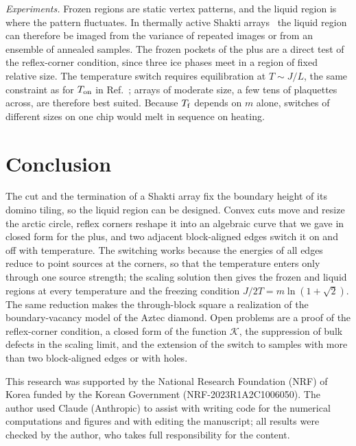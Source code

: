 \documentclass[reprint,aps,prb,floatfix,longbibliography,amsmath,amssymb]{revtex4-2}
\newcommand{\cK}{\mathcal{K}}
\newcommand{\lnt}{\ln(1+\sqrt2)}
\begin{document}
\emph{Experiments.} Frozen regions are static vertex patterns, and the liquid region is where the pattern fluctuates. In thermally active Shakti arrays~\cite{Gilbert2014,Lao2018} the liquid region can therefore be imaged from the variance of repeated images or from an ensemble of annealed samples. The frozen pockets of the plus are a direct test of the reflex-corner condition, since three ice phases meet in a region of fixed relative size. The temperature switch requires equilibration at $T\sim J/L$, the same constraint as for $T_{\rm on}$ in Ref.~\cite{KimVorticity}; arrays of moderate size, a few tens of plaquettes across, are therefore best suited. Because $T_{\rm f}$ depends on $m$ alone, switches of different sizes on one chip would melt in sequence on heating.

\section{Conclusion}\label{sec:conclusion}

The cut and the termination of a Shakti array fix the boundary height of its domino tiling, so the liquid region can be designed. Convex cuts move and resize the arctic circle, reflex corners reshape it into an algebraic curve that we gave in closed form for the plus, and two adjacent block-aligned edges switch it on and off with temperature. The switching works because the energies of all edges reduce to point sources at the corners, so that the temperature enters only through one source strength; the scaling solution then gives the frozen and liquid regions at every temperature and the freezing condition $J/2T=m\lnt$. The same reduction makes the through-block square a realization of the boundary-vacancy model of the Aztec diamond. Open problems are a proof of the reflex-corner condition, a closed form of the function $\cK$, the suppression of bulk defects in the scaling limit, and the extension of the switch to samples with more than two block-aligned edges or with holes.

\begin{acknowledgments}
This research was supported by the National Research Foundation (NRF) of Korea funded by the Korean Government (NRF-2023R1A2C1006050). The author used Claude (Anthropic) to assist with writing code for the numerical computations and figures and with editing the manuscript; all results were checked by the author, who takes full responsibility for the content.
\end{acknowledgments}
\end{document}
